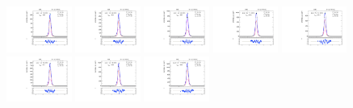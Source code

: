 \begin{figure}[htb]
\centering
\includegraphics[width=0.19\textwidth]{plots/Appendix_Recoil_Fits/ZmmMC_PF_5TeV_2G/pfu2fit_0.pdf}
\includegraphics[width=0.19\textwidth]{plots/Appendix_Recoil_Fits/ZmmMC_PF_5TeV_2G/pfu2fit_1.pdf}
\includegraphics[width=0.19\textwidth]{plots/Appendix_Recoil_Fits/ZmmMC_PF_5TeV_2G/pfu2fit_2.pdf}
\includegraphics[width=0.19\textwidth]{plots/Appendix_Recoil_Fits/ZmmMC_PF_5TeV_2G/pfu2fit_3.pdf}
\includegraphics[width=0.19\textwidth]{plots/Appendix_Recoil_Fits/ZmmMC_PF_5TeV_2G/pfu2fit_4.pdf}
\includegraphics[width=0.19\textwidth]{plots/Appendix_Recoil_Fits/ZmmMC_PF_5TeV_2G/pfu2fit_5.pdf}
\includegraphics[width=0.19\textwidth]{plots/Appendix_Recoil_Fits/ZmmMC_PF_5TeV_2G/pfu2fit_6.pdf}
\includegraphics[width=0.19\textwidth]{plots/Appendix_Recoil_Fits/ZmmMC_PF_5TeV_2G/pfu2fit_7.pdf}

\end{figure}
